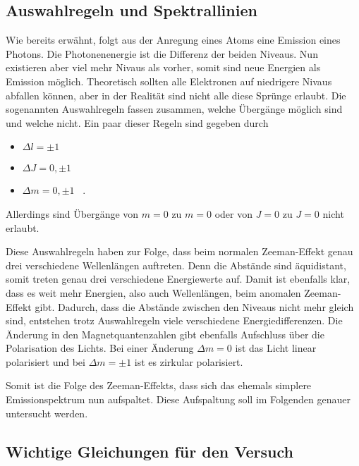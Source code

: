 \subsection{Auswahlregeln und Spektrallinien}
\label{ssec:theo5}

Wie bereits erwähnt, folgt aus der Anregung eines Atoms eine Emission eines Photons.
Die Photonenenergie ist die Differenz der beiden Niveaus.
Nun existieren aber viel mehr Nivaus als vorher, somit sind neue Energien als Emission möglich. 
Theoretisch sollten alle Elektronen auf niedrigere Nivaus abfallen können, aber in der Realität sind nicht alle diese Sprünge erlaubt.
Die sogenannten Auswahlregeln fassen zusammen, welche Übergänge möglich sind und welche nicht.
Ein paar dieser Regeln sind gegeben durch
\begin{itemize} 
    \item $\Delta l = \pm 1$
    \item $\Delta J = 0, \pm 1$
    \item $\Delta m = 0, \pm 1$ \, .
\end{itemize}
Allerdings sind Übergänge von $m = 0$ zu $m = 0$ oder von $J = 0$ zu $J = 0$ nicht erlaubt.

Diese Auswahlregeln haben zur Folge, dass beim normalen Zeeman-Effekt genau drei verschiedene Wellenlängen auftreten. 
Denn die Abstände sind äquidistant, somit treten genau drei verschiedene Energiewerte auf.
Damit ist ebenfalls klar, dass es weit mehr Energien, also auch Wellenlängen, beim anomalen Zeeman-Effekt gibt.
Dadurch, dass die Abstände zwischen den Niveaus nicht mehr gleich sind, entstehen trotz Auswahlregeln viele verschiedene Energiedifferenzen.
Die Änderung in den Magnetquantenzahlen gibt ebenfalls Aufschluss über die Polarisation des Lichts. 
Bei einer Änderung $\Delta m = 0$ ist das Licht linear polarisiert und bei $\Delta m = \pm 1$ ist es zirkular polarisiert.

Somit ist die Folge des Zeeman-Effekts, dass sich das ehemals simplere Emissionspektrum nun aufspaltet.
Diese Aufspaltung soll im Folgenden genauer untersucht werden. 

\subsection{Wichtige Gleichungen für den Versuch}
\label{ssec:theo6}

